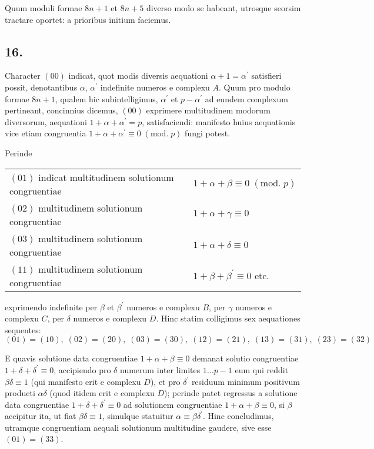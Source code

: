 \documentclass[twoside,12pt, showframe]{memoir}
\renewcommand{\pmod}[1]{\;(\textrm{mod.}\;#1)}
\begin{document}
Quum moduli formae \(8 n+1\) et \(8 n+5\) diverso modo se habeant, utrosque seorsim tractare oportet: a prioribus initium faciemus.

\subsection*{16.}
 
Character \((00)\) indicat, quot modis diversis aequationi \(\alpha+1=\alpha^{\prime}\) satisfieri possit, denotantibus \(\alpha\), \(\alpha^{\prime}\) indefinite numeros e complexu \(A\). Quum pro modulo formae \(8 n+1\), qualem hic subintelligimus, \(\alpha^{\prime}\) et \(p-\alpha^{\prime}\) ad eundem complexum pertineant, concinnius dicemus, \((00)\) exprimere multitudinem modorum diversorum, aequationi \(1+\alpha+\alpha^{\prime}=p\), satisfaciendi: manifesto huius aequationis vice etiam congruentia \(1+\alpha+\alpha^{\prime} \equiv 0\pmod{p}\) fungi potest.

Perinde
\begin{center}
\begin{tabular}{ll}
\((01)\) indicat multitudinem solutionum congruentiae& \(1+\alpha+\beta \equiv 0\pmod{p}\) \\
\((02)\) multitudinem solutionum congruentiae& \(1+\alpha+\gamma \equiv 0\) \\
\((03)\) multitudinem solutionum congruentiae& \(1+\alpha+\delta \equiv 0\) \\
\((11)\) multitudinem solutionum congruentiae& \(1+\beta+\beta^{\prime} \equiv 0\) etc. \\
\end{tabular}
\end{center}
exprimendo indefinite per \(\beta\) et \(\beta^{\prime}\) numeros e complexu \(B\), per \(\gamma\) numeros e complexu \(C\), per \(\delta\) numeros e complexu \(D\). Hinc statim colligimus sex aequationes sequentes:
\[(01)=(10), \; (02)=(20), \; (03)=(30), \; (12)=(21), \;(13)=(31), \;(23)=(32)\]

E quavis solutione data congruentiae \(1+\alpha+\beta \equiv 0\) demanat solutio congruentiae \(1+\delta+\delta^{\prime} \equiv 0\), accipiendo pro \(\delta\) numerum inter limites \(1 \ldots p-1\)\clearpage\noindent%
eum qui reddit \(\beta \delta \equiv 1\) (qui manifesto erit e complexu \(D\)), et pro \(\delta^{\prime}\) residuum minimum positivum producti \(\alpha \delta\) (quod itidem erit e complexu \(D\)); perinde patet regressus a solutione data congruentiae \(1+\delta+\delta^{\prime} \equiv 0\) ad solutionem congruentiae \(1+\alpha+\beta \equiv 0\), si \(\beta\) accipitur ita, ut fiat \(\beta \delta \equiv 1\), simulque statuitur \(\alpha \equiv \beta \delta^{\prime}\). Hinc concludimus, utramque congruentiam aequali solutionum multitudine gaudere, sive esse \((01)=(33)\).
 
\end{document}
